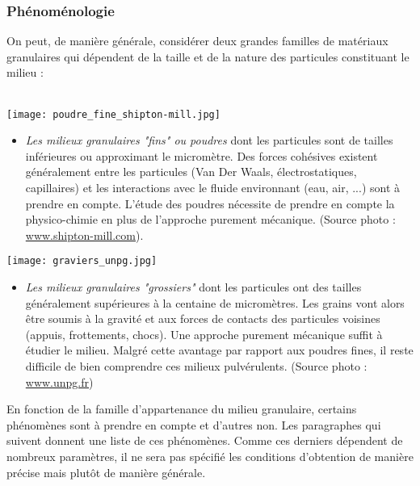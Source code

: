 		\subsubsection{Phénoménologie}
			On peut, de manière générale, considérer deux grandes familles de matériaux granulaires qui dépendent de la taille et de la nature des particules constituant le milieu :
			\\\vspace{1mm}\\
			\begin{minipage}[c]{0.24\linewidth}
				\texttt{[image: poudre\_fine\_shipton-mill.jpg]}
			\end{minipage}\hfill
			\begin{minipage}[c]{0.74\linewidth}
				\begin{itemize}
					\item \emph{Les milieux granulaires "fins" ou poudres} dont les particules sont de tailles inférieures ou approximant le micromètre. Des forces cohésives existent généralement entre les particules (Van Der Waals, électrostatiques, capillaires) et les interactions avec le fluide environnant (eau, air, ...) sont à prendre en compte. L'étude des poudres nécessite de prendre en compte la physico-chimie en plus de l'approche purement mécanique. (Source photo : \url{www.shipton-mill.com}).
				\end{itemize}
			\end{minipage}\vspace{5mm}
			\begin{minipage}[c]{0.24\linewidth}
				\texttt{[image: graviers\_unpg.jpg]}
			\end{minipage}\hfill
			\begin{minipage}[c]{0.74\linewidth}
				\begin{itemize}	
					\item \emph{Les milieux granulaires "grossiers"} dont les particules ont des tailles généralement supérieures à la centaine de micromètres. Les grains vont alors être soumis à la gravité et aux forces de contacts des particules voisines (appuis, frottements, chocs). Une approche purement mécanique suffit à étudier le milieu. Malgré cette avantage par rapport aux poudres fines, il reste difficile de bien comprendre ces milieux pulvérulents. (Source photo : \url{www.unpg.fr})
				\end{itemize}
			\end{minipage}\vspace{5mm}
			En fonction de la famille d'appartenance du milieu granulaire, certains phénomènes sont à prendre en compte et d'autres non. Les paragraphes qui suivent donnent une liste de ces phénomènes. Comme ces derniers dépendent de nombreux paramètres, il ne sera pas spécifié les conditions d'obtention de manière précise mais plutôt de manière générale.
